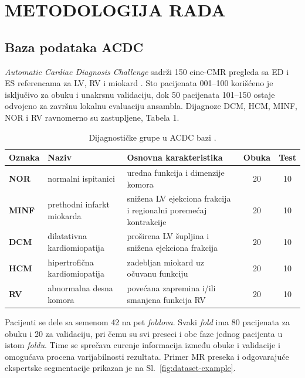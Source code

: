 \documentclass[11pt,a4paper]{article}
\begin{document}
\section{METODOLOGIJA RADA}
\subsection{Baza podataka ACDC}
\textit{Automatic Cardiac Diagnosis Challenge} sadrži 150 cine-CMR pregleda sa ED i ES referencama
za LV, RV i miokard \cite{bernard2018,acdcweb}. Sto pacijenata 001--100 korišćeno je isključivo za
obuku i unakrsnu validaciju, dok 50 pacijenata 101--150 ostaje odvojeno za završnu lokalnu evaluaciju
ansambla. Dijagnoze DCM, HCM, MINF, NOR i RV ravnomerno su zastupljene, Tabela 1.

\begin{table}[H]
	\centering
	\caption{Dijagnostičke grupe u ACDC bazi \cite{bernard2018}.}
	\label{tab:acdc-groups}
	\begin{tabularx}{\textwidth}{>{\bfseries}l l X c c}
		\toprule
		Oznaka & Naziv                         & Osnovna karakteristika                                           & Obuka & Test \\
		\midrule
		NOR    & normalni ispitanici           & uredna funkcija i dimenzije komora                               & 20    & 10   \\
		MINF   & prethodni infarkt miokarda    & snižena LV ejekciona frakcija i regionalni poremećaj kontrakcije & 20    & 10   \\
		DCM    & dilatativna kardiomiopatija   & proširena LV šupljina i snižena ejekciona frakcija               & 20    & 10   \\
		HCM    & hipertrofična kardiomiopatija & zadebljan miokard uz očuvanu funkciju                            & 20    & 10   \\
		RV     & abnormalna desna komora       & povećana zapremina i/ili smanjena funkcija RV                    & 20    & 10   \\
		\bottomrule
	\end{tabularx}
\end{table}


Pacijenti se dele sa semenom 42 na pet \textit{foldova}. Svaki \textit{fold} ima 80 pacijenata za obuku i 20 za
validaciju, pri čemu su svi preseci i obe faze jednog pacijenta u istom \textit{foldu}. Time se sprečava
curenje informacija između obuke i validacije i omogućava procena varijabilnosti rezultata.
Primer MR preseka i odgovarajuće ekspertske segmentacije prikazan je na Sl.~\ref{fig:dataset-example}.
\end{document}
